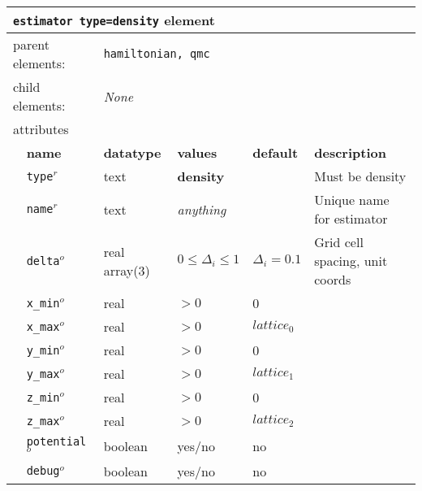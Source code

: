\FloatBarrier
\begin{table}[h]
\begin{center}
\begin{tabularx}{\textwidth}{l l l l l l }
\hline
\multicolumn{6}{l}{\texttt{estimator type=density} element} \\
\hline
\multicolumn{2}{l}{parent elements:} & \multicolumn{4}{l}{\texttt{hamiltonian, qmc}}\\
\multicolumn{2}{l}{child  elements:} & \multicolumn{4}{l}{\textit{None}}\\
\multicolumn{2}{l}{attributes}  & \multicolumn{4}{l}{}\\
   &   \bfseries name     & \bfseries datatype & \bfseries values  & \bfseries default   & \bfseries description \\
   & \texttt{type}$^r$      &  text              & \textbf{density}      &                     & Must be density         \\
   & \texttt{name}$^r$      &  text              & \textit{anything}     &                     & Unique name for estimator \\
   & \texttt{delta}$^o$     &  real array(3)     & $0\le \Delta_i \le 1$ & $\Delta_i=0.1$      & Grid cell spacing, unit coords\\
   & \texttt{x\_min}$^o$    &  real              & $>0$                  & 0                   & \\
   & \texttt{x\_max}$^o$    &  real              & $>0$                  & ${lattice_0}$  & \\
   & \texttt{y\_min}$^o$    &  real              & $>0$                  & 0                   & \\
   & \texttt{y\_max}$^o$    &  real              & $>0$                  & ${lattice_1}$  & \\
   & \texttt{z\_min}$^o$    &  real              & $>0$                  & 0                   & \\
   & \texttt{z\_max}$^o$    &  real              & $>0$                  & ${lattice_2}$  & \\
   & \texttt{potential}$^o$ &  boolean           & yes/no                & no                  & \\
   & \texttt{debug}$^o$     &  boolean           & yes/no                & no                  & \\
  \hline
\end{tabularx}
\end{center}
\end{table}
\FloatBarrier


